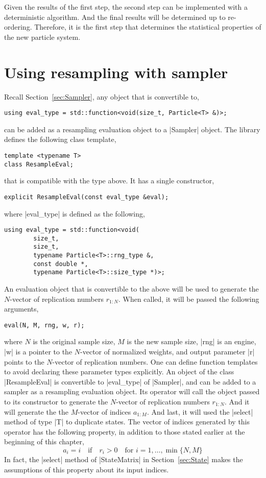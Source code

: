 Given the results of the first step, the second step can be implemented with a
deterministic algorithm. And the final results will be determined up to
re-ordering. Therefore, it is the first step that determines the statistical
properties of the new particle system.

\section{Using resampling with sampler}
\label{sec:Using resampling with sampler}

Recall Section~\ref{sec:Sampler}, any object that is convertible to,
\begin{Verbatim}
using eval_type = std::function<void(size_t, Particle<T> &)>;
\end{Verbatim}
can be added as a resampling evaluation object to a |Sampler| object. The
library defines the following class template,
\begin{Verbatim}
template <typename T>
class ResampleEval;
\end{Verbatim}
that is compatible with the type above. It has a single constructor,
\begin{Verbatim}
explicit ResampleEval(const eval_type &eval);
\end{Verbatim}
where |eval_type| is defined as the following,
\begin{Verbatim}
using eval_type = std::function<void(
        size_t,
        size_t,
        typename Particle<T>::rng_type &,
        const double *,
        typename Particle<T>::size_type *)>;
\end{Verbatim}
An evaluation object that is convertible to the above will be used to generate
the $N$-vector of replication numbers $r_{1:N}$. When called, it will be passed
the following arguments,
\begin{Verbatim}
eval(N, M, rng, w, r);
\end{Verbatim}
where $N$ is the original sample size, $M$ is the new sample size, |rng| is an
\rng engine, |w| is a pointer to the $N$-vector of normalized weights, and
output parameter |r| points to the $N$-vector of replication numbers. One can
define function templates to avoid declaring these parameter types explicitly.
An object of the class |ResampleEval| is convertible to |eval_type| of
|Sampler|, and can be added to a sampler as a resampling evaluation object. Its
operator will call the object passed to its constructor to generate the
$N$-vector of replication numbers $r_{1:N}$. And it will generate the the
$M$-vector of indices $a_{1:M}$. And last, it will used the |select| method of
type |T| to duplicate states. The vector of indices generated by this operator
has the following property, in addition to those stated earlier at the
beginning of this chapter,
\begin{equation*}
  a_i = i \quad \text{if} \quad  r_i > 0 \quad
  \text{for } i = 1,\dots,\min\{N, M\}
\end{equation*}
In fact, the |select| method of |StateMatrix| in Section~\ref{sec:State} makes
the assumptions of this property about its input indices.

